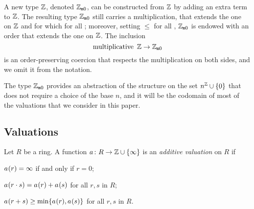\documentclass[sigplan,10pt, nonacm, review]{acmart}
\begin{document}
A new type  $\mathbb{Z}$\code{)}, denoted $\mathbb{Z}_{\mathtt{m}0}$, can be constructed from  $\mathbb{Z}$ by adding an extra term  to  $\mathbb{Z}$. The resulting type $\mathbb{Z}_{\mathtt{m}0}$ still carries a multiplication, that extends the one on  $\mathbb{Z}$ and for which  for all ; moreover, setting  $\le$  for all , $\mathbb{Z}_{\mathtt{m}0}$ is endowed with an order that extends the one on  $\mathbb{Z}$. The inclusion
\[
\text{\code{multiplicative} }\ZZ \rightarrow \wzmZZ
\]
is an order-preserving coercion that respects the multiplication on both sides, and we omit it from the notation.

The type $\mathbb{Z}_{\mathtt{m}0}$ provides an abstraction of the structure on the set $n^{\mathbb{Z}} \cup \{0\}$ that does not require a choice of the base $n$, and it will be the codomain of most of the valuations that we consider in this paper.

\subsection{Valuations}\label{subsection:valuations}
\begin{definition}\label{def:add_valuation}
Let $R$ be a ring. A function $\av \colon R \to \ZZ \cup \{\infty\}$ is an \emph{additive valuation} on $R$ if
\begin{listDef}
	\item $\av(r) = \infty$ if and only if $r = 0$; \label{def_add_valuation:zero}
	\item $\av (r\cdot s) = \av(r) + \av(s)$ for all $r, s$ in $R$;\label{def_add_valuation:mul}
	\item $\av (r + s) \geq \min \{\av(r), \av(s)\}$ for all $r, s$ in $R$. \label{def_add_valuation:add}
\end{listDef}
\end{definition}
\end{document}
